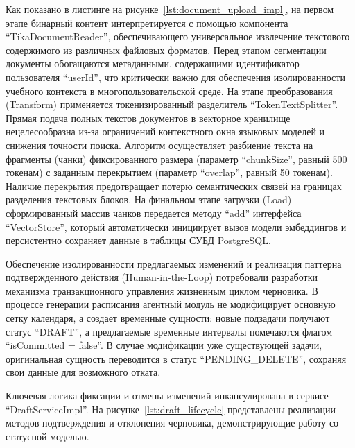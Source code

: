 Как показано в листинге на рисунке~\ref{lst:document_upload_impl}, на первом этапе бинарный контент интерпретируется с помощью компонента ``TikaDocumentReader'', обеспечивающего универсальное извлечение текстового содержимого из различных файловых форматов. Перед этапом сегментации документы обогащаются метаданными, содержащими идентификатор пользователя ``userId'', что критически важно для обеспечения изолированности учебного контекста в многопользовательской среде. На этапе преобразования (Transform) применяется токенизированный разделитель ``TokenTextSplitter''. Прямая подача полных текстов документов в векторное хранилище нецелесообразна из-за ограничений контекстного окна языковых моделей и снижения точности поиска. Алгоритм осуществляет разбиение текста на фрагменты (чанки) фиксированного размера (параметр ``chunkSize'', равный 500 токенам) с заданным перекрытием (параметр ``overlap'', равный 50 токенам). Наличие перекрытия предотвращает потерю семантических связей на границах разделения текстовых блоков. На финальном этапе загрузки (Load) сформированный массив чанков передается методу ``add'' интерфейса ``VectorStore'', который автоматически инициирует вызов модели эмбеддингов и персистентно сохраняет данные в таблицы СУБД PostgreSQL.

\numberedparagraph
Обеспечение изолированности предлагаемых изменений и реализация паттерна подтвержденного действия (Human-in-the-Loop)
потребовали разработки механизма транзакционного управления жизненным циклом черновика.
В процессе генерации расписания агентный модуль не модифицирует основную сетку календаря, а создает временные сущности: новые подзадачи получают статус ``DRAFT'', а предлагаемые временные интервалы помечаются флагом ``isCommitted = false''. 
В случае модификации уже существующей задачи, оригинальная сущность переводится в статус ``PENDING\_DELETE'', сохраняя свои данные для возможного отката. 

Ключевая логика фиксации и отмены изменений инкапсулирована в сервисе ``DraftServiceImpl''. На рисунке~\ref{lst:draft_lifecycle} представлены реализации методов подтверждения и отклонения черновика, демонстрирующие работу со статусной моделью.

